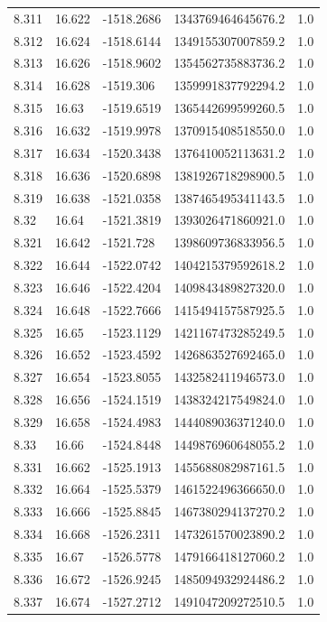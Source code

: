 \begin{tabular}{lllll}
8.311 & 16.622 & -1518.2686 & 1343769464645676.2 & 1.0 \\
8.312 & 16.624 & -1518.6144 & 1349155307007859.2 & 1.0 \\
8.313 & 16.626 & -1518.9602 & 1354562735883736.2 & 1.0 \\
8.314 & 16.628 & -1519.306 & 1359991837792294.2 & 1.0 \\
8.315 & 16.63 & -1519.6519 & 1365442699599260.5 & 1.0 \\
8.316 & 16.632 & -1519.9978 & 1370915408518550.0 & 1.0 \\
8.317 & 16.634 & -1520.3438 & 1376410052113631.2 & 1.0 \\
8.318 & 16.636 & -1520.6898 & 1381926718298900.5 & 1.0 \\
8.319 & 16.638 & -1521.0358 & 1387465495341143.5 & 1.0 \\
8.32 & 16.64 & -1521.3819 & 1393026471860921.0 & 1.0 \\
8.321 & 16.642 & -1521.728 & 1398609736833956.5 & 1.0 \\
8.322 & 16.644 & -1522.0742 & 1404215379592618.2 & 1.0 \\
8.323 & 16.646 & -1522.4204 & 1409843489827320.0 & 1.0 \\
8.324 & 16.648 & -1522.7666 & 1415494157587925.5 & 1.0 \\
8.325 & 16.65 & -1523.1129 & 1421167473285249.5 & 1.0 \\
8.326 & 16.652 & -1523.4592 & 1426863527692465.0 & 1.0 \\
8.327 & 16.654 & -1523.8055 & 1432582411946573.0 & 1.0 \\
8.328 & 16.656 & -1524.1519 & 1438324217549824.0 & 1.0 \\
8.329 & 16.658 & -1524.4983 & 1444089036371240.0 & 1.0 \\
8.33 & 16.66 & -1524.8448 & 1449876960648055.2 & 1.0 \\
8.331 & 16.662 & -1525.1913 & 1455688082987161.5 & 1.0 \\
8.332 & 16.664 & -1525.5379 & 1461522496366650.0 & 1.0 \\
8.333 & 16.666 & -1525.8845 & 1467380294137270.2 & 1.0 \\
8.334 & 16.668 & -1526.2311 & 1473261570023890.2 & 1.0 \\
8.335 & 16.67 & -1526.5778 & 1479166418127060.2 & 1.0 \\
8.336 & 16.672 & -1526.9245 & 1485094932924486.2 & 1.0 \\
8.337 & 16.674 & -1527.2712 & 1491047209272510.5 & 1.0 \\

\end{tabular}
